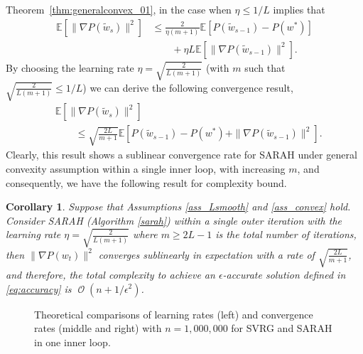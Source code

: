 \documentclass{article}
\newtheorem{cor}{Corollary}
\DeclareMathOperator{\Ocal}{\mathcal{O}}
\begin{document}
 Theorem~\ref{thm:generalconvex_01}, in the case when $\eta\leq 1/L$ implies that
\begin{align*}
\mathbb{E}[ \| \nabla P(\tilde{w}_s)\|^2 ] 
&\leq \tfrac{2}{\eta (m + 1)} \mathbb{E}[ P(\tilde w_{s-1}) - P(w^{*})]  
\\ %
&\qquad + { \eta L} \mathbb{E}[ \| \nabla P(\tilde w_{s-1})\|^2].
\end{align*}
By choosing the learning rate $\eta = \sqrt{\frac{2}{L(m+1)}}$ (with $m$ such that   $\sqrt{\frac{2}{L(m+1)}}\leq 1/L$) we can derive the following convergence result,
\begin{align*}
&\mathbb{E}[ \| \nabla P(\tilde{w}_s)\|^2 ] 
\\ %
&\qquad \leq \sqrt{\tfrac{2L}{m + 1}} \mathbb{E}[ P(\tilde w_{s-1}) - P(w^{*}) + \| \nabla P(\tilde w_{s-1})\|^2].
\end{align*}
Clearly, this result shows a sublinear convergence rate for SARAH under general convexity assumption within a single inner loop, with increasing $m$, 
and consequently, we have the following result  for complexity bound. 
\begin{cor}\label{cor:generalconvex_1}
Suppose that Assumptions \ref{ass_Lsmooth} and \ref{ass_convex} hold. Consider SARAH (Algorithm \ref{sarah}) within a single outer iteration with the learning rate $\eta = \sqrt{\frac{2}{L(m+1)}}$ where $m\geq 2L - 1$ is the total number of iterations, then  $\|\nabla P(w_t)\|^2$ converges
sublinearly in expectation  with a rate of $\sqrt{\frac{2L}{m+1}}$, and therefore, the total complexity to achieve an $\epsilon$-accurate solution defined in \eqref{eq:accuracy} is $\Ocal(n+1/\epsilon^2)$.   
\end{cor}

\begin{figure*}%
\centering
  \caption{\footnotesize Theoretical comparisons of learning rates (left) and convergence rates (middle and right) with $n=1,000,000$ for SVRG and SARAH in one inner loop.}
  \label{fig:comparison}
 \end{figure*}  
\end{document}
